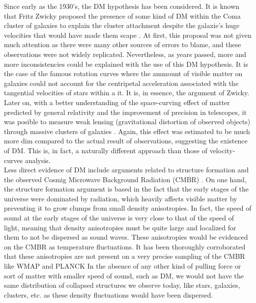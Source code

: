 Since early as the 1930's, the DM hypothesis has been considered. It is known that Fritz Zwicky proposed the presence of some kind of DM within the Coma cluster of galaxies to explain the cluster attachment despite the galaxie's huge velocities that would have made them scape \cite{Fritz}. At first, this proposal was not given much attention as there were many other sources of errors to blame, and these observations were not widely replicated. Nevertheless, as years passed, more and more inconsistencies could be explained with the use of this DM hypothesis. It is the case of the famous rotation curves \cite{rotationCurves} where the ammount of visible matter on galaxies could not account for the centripetal acceleration associated with the tangential velocities of stars within a it. It is, in essence, the argument of Zwicky. Later on, with a better understanding of the space-curving effect of matter predicted by general relativity and the improvement of precision in telescopes, it was posible to measure weak lensing (gravitational distortion of observed objects) through massive clusters of galaxies \cite{weak_Lensing}. Again, this effect was estimated to be much more dim compared to the actual result of observations, suggesting the existence of DM. This is, in fact, a naturally different approach than those of velocity-curves analysis.\\

Less direct evidence of DM include arguments related to structure formation and the observed Cosmig Microwave Background Radiation (CMBR) \cite{structure formation}. On one hand, the structure formation argument is based in the fact that the early stages of the universe were dominated by radiation, which heavily affects visible matter by preventing it to grow clumps from small density anisotropies. In fact, the speed of sound at the early stages of the universe is very close to that of the speed of light, meaning that density anisotropies must be quite large and localized for them to not be dispersed as sound waves. These anisotropies would be evidenced on the CMBR as temperature fluctuations. It has been thoroughly corroborated that these anisotropies are not present on a very precise sampling of the CMBR like WMAP \cite{WMAP} and PLANCK \cite{PLANCK} In the absence of any other kind of pulling force or sort of matter with smaller speed of sound, such as DM, we would not have the same distribution of collapsed structures we observe today, like stars, galaxies, clusters, etc. as these density fluctuations would have been dispersed. \\


